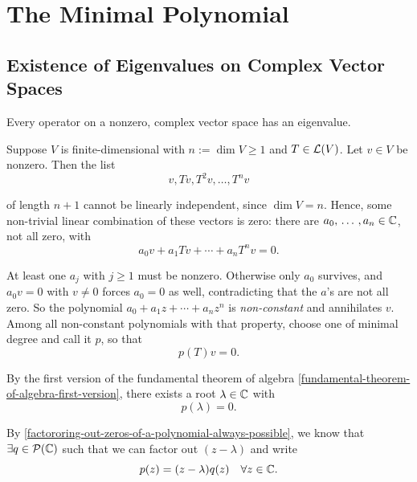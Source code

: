 \section{The Minimal Polynomial}
\subsection{Existence of Eigenvalues on Complex Vector Spaces}

\begin{thm} 
  \label{thm: existence of eigenvalues}
  Every operator on a \fd non\-zero, complex vector space has an eigenvalue.
\end{thm}
\begin{prf}
  Suppose $V$ is finite-dimensional with $n := \dim V \geq 1$ and $T\in \mathcal{L}(V)$. Let $v\in V$ be nonzero. Then the list
  \begin{equation}
    v, Tv, T^2v, \dots, T^nv
  \end{equation}

  of length $n+1$ cannot be linearly independent, since $\dim V = n$. Hence, some non-trivial linear combination of these vectors is zero: there are $a_0, {\, \ldots \,\,}, a_n \in \mathbb{C}$, not all zero, with
  \begin{equation}
    a_0 v + a_1 Tv + \cdots + a_n T^n v = 0.
  \end{equation}

  At least one $a_j$ with $j \geq 1$ must be nonzero. Otherwise only $a_0$ survives, and $a_0 v = 0$ with $v \neq 0$ forces $a_0 = 0$ as well, contradicting that the $a$'s are not all zero. So the polynomial $a_0 + a_1 z + \cdots + a_n z^n$ is \emph{non-constant} and annihilates $v$. Among all non-constant polynomials with that property, choose one of minimal degree and call it $p$, so that
  \begin{equation}
    p(T)v = 0.
  \end{equation}

  By the first version of the fundamental theorem of algebra \ref{fundamental-theorem-of-algebra-first-version}, there exists a root $\lambda \in \mathbb{C}$ with
  \begin{equation}
    p(\lambda) = 0.
  \end{equation}

  By \ref{factororing-out-zeros-of-a-polynomial-always-possible}, we know that $\exists q \in \mathcal {P} (\mathbb{C})$ such that we can factor out $(z-\lambda)$ and write
  \begin{equation}
    p(z) = (z-\lambda)  q(z) \quad \forall z \in \mathbb{C}.
  \end{equation}


\end{prf}
